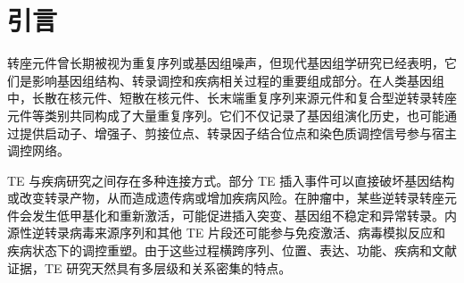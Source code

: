 \documentclass[12pt,a4paper,UTF8]{ctexart}
\begin{document}
\cover
\clearpage

\thispagestyle{empty}
\begin{abstract}
转座元件（transposable elements, TEs）是人类基因组的重要组成部分，能够通过插入突变、基因组重排、转录调控、表观遗传失衡和调控元件供给等方式影响基因组功能与疾病相关过程\cite{lander2001human,cordaux2009retrotransposons,chuong2017regulatory,bourque2018ten,burns2017cancer,payer2019genetic}。然而，TE 相关数据长期分散在重复序列注释、分类资源、表达矩阵、基因组位置、疾病文献和人工整理条目中。研究者若希望回答某一 TE 是否与疾病、功能或分子机制相关，往往需要在多个资源之间切换，并且难以追踪每一条关系背后的文献证据。本文构建 TE-KG，一个面向人类转座元件功能与疾病证据整合的知识图谱数据库。该数据库以医学文献数据库（PubMed）检索、TE 白名单、实体关系抽取、实体规范化、分类体系构建和图数据库整合为核心流程，并结合序列、基因组位置、表达数据、图谱浏览、路径探索和自然语言问答助手，为 TE 研究提供可浏览、可追踪和可复用的数据入口。当前数据构建流程从 34,788 篇人类 TE 相关候选文献出发，经白名单筛选和模型辅助抽取后保留 2,308 篇核心文献；运行图谱包含 11,415 个节点和 13,696 条有向关系，本地资源还包括 5,683,690 条重复序列注释记录、299 条 TE 分类记录、37,868 条表达浏览摘要、143 个表达上下文和 113,604 条表达数据集摘要。TE-KG 的定位不是自动给出未经审查的因果结论，而是以可追踪证据链支持 TE 疾病机制假设生成和数据库化复用。

\textbf{关键词：}转座元件；知识图谱；数据库；疾病证据；文献挖掘；智能问答
\end{abstract}

\clearpage
\tableofcontents

\clearpage
{}

\section{引言}

转座元件曾长期被视为重复序列或基因组噪声，但现代基因组学研究已经表明，它们是影响基因组结构、转录调控和疾病相关过程的重要组成部分。在人类基因组中，长散在核元件、短散在核元件、长末端重复序列来源元件和复合型逆转录转座元件等类别共同构成了大量重复序列。它们不仅记录了基因组演化历史，也可能通过提供启动子、增强子、剪接位点、转录因子结合位点和染色质调控信号参与宿主调控网络\cite{cordaux2009retrotransposons,chuong2017regulatory,bourque2018ten}。

TE 与疾病研究之间存在多种连接方式。部分 TE 插入事件可以直接破坏基因结构或改变转录产物，从而造成遗传病或增加疾病风险\cite{payer2019genetic}。在肿瘤中，某些逆转录转座元件会发生低甲基化和重新激活，可能促进插入突变、基因组不稳定和异常转录\cite{burns2017cancer}。内源性逆转录病毒来源序列和其他 TE 片段还可能参与免疫激活、病毒模拟反应和疾病状态下的调控重塑。由于这些过程横跨序列、位置、表达、功能、疾病和文献证据，TE 研究天然具有多层级和关系密集的特点。
\end{document}
